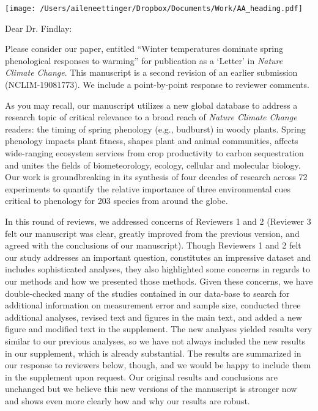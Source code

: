 \documentclass[11.5pt,a4paper]{letter}
\begin{document}
\begin{letter}{}
\texttt{[image: /Users/aileneettinger/Dropbox/Documents/Work/AA\_heading.pdf]}

\opening{Dear Dr. Findlay:}
Please consider our paper, entitled ``Winter temperatures dominate spring phenological responses to warming'' for publication as a `Letter' in \emph{Nature Climate Change}. This manuscript is a second revision of an earlier submission (NCLIM-19081773). We include a point-by-point response to reviewer comments. 

\par As you may recall, our manuscript utilizes a new global database to address a research topic of critical relevance to a broad reach of \emph{Nature Climate Change} readers:  the timing of spring phenology (e.g., budburst) in woody plants. Spring phenology impacts plant fitness, shapes plant and animal communities, affects wide-ranging ecosystem services from crop productivity to carbon sequestration and unites the fields of biometeorology, ecology, cellular and molecular biology. Our work is groundbreaking in its synthesis of four decades of research across 72 experiments to quantify the relative importance of three environmental cues critical to phenology for 203 species from around the globe. 

\par In this round of reviews, we addressed concerns of Reviewers 1 and 2 (Reviewer 3 felt our manuscript was clear, greatly improved from the previous version, and agreed with the conclusions of our manuscript). Though Reviewers 1 and 2  felt our study addresses an important question, constitutes an impressive dataset and includes sophisticated analyses, they also highlighted some concerns in regards to our methods and how we presented those methods. Given these concerns, we have double-checked many of the studies contained in our data-base to search for additional information on measurement error and sample size, conducted three additional analyses, revised text and figures in the main text, and added a new figure and modified text in the supplement. The new analyses yielded results very similar to our previous analyses, so we have not always included the new results in our supplement, which is already substantial. The results are summarized in our response to reviewers below, though, and we would be happy to include them in the supplement upon request. Our original results and conclusions are unchanged but we believe this new versions of the manuscript is stronger now and shows even more clearly how and why our results are robust.


\end{letter}
\end{document}
